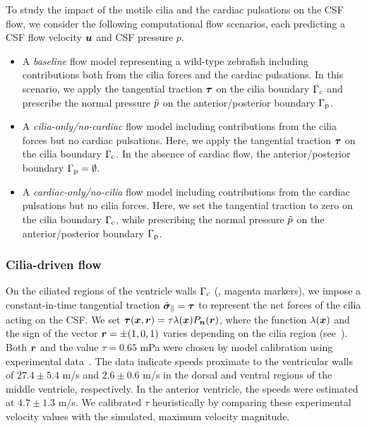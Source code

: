 \documentclass{WileyMSP-template}
\begin{document}
To study the impact of the motile cilia and the cardiac pulsations on the CSF flow,
we consider the following computational flow scenarios,
each predicting a CSF flow velocity $\bm{u}$ and CSF pressure $p$.
\begin{itemize}
    \item A \emph{baseline} flow model representing a wild-type zebrafish including 
    contributions both from the cilia forces and the cardiac pulsations.
    In this scenario, we apply the tangential traction $\bm{\tau}$ on the cilia boundary
    $\Gamma_{\mathrm{c}}$ and prescribe the normal pressure $\Tilde{p}$ on the anterior/posterior boundary $\Gamma_{\mathrm{p}}$. %

    \item A \emph{cilia-only/no-cardiac} flow model including contributions from the
    cilia forces but no cardiac pulsations.
    Here, we apply the tangential traction $\bm{\tau}$ on the cilia boundary $\Gamma_{\mathrm{c}}$.
    In the absence of cardiac flow, the anterior/posterior boundary $\Gamma_{\mathrm{p}}=\emptyset$. %

    \item A \emph{cardiac-only/no-cilia} flow model including contributions from the
    cardiac pulsations but no cilia forces.
    Here, we set the tangential traction to zero on the cilia boundary
    $\Gamma_{\mathrm{c}}$, while prescribing the normal pressure $\Tilde{p}$ on the
    anterior/posterior boundary $\Gamma_{\mathrm{p}}$.  %
\end{itemize}

\subsubsection{Cilia-driven flow}
On the ciliated regions of the ventricle walls $\Gamma_{\mathrm{c}}$ (, magenta markers),
we impose a constant-in-time tangential traction $\hat{\bm{\sigma}}_{\parallel}=\bm{\tau}$ to represent the net forces
of the cilia acting on the CSF.
We set $\bm{\tau}(\bm{x}, \bm{r}) = \tau \lambda(\bm{x}) P_{\bm{n}}(\bm{r})$, where the function $\lambda(\bm{x})$
and the sign of the vector $\bm{r}=\pm(1, 0, 1)$ varies depending on the
cilia region (see~).
Both $\bm{r}$ and the value $\tau=0.65$ mPa were chosen by 
model calibration using experimental data~\cite{Olstad2019CiliaryDevelopment}.
The data indicate speeds proximate to the ventricular walls of $27.4 \pm 5.4$ \textmu m/s and
$2.6 \pm 0.6$ \textmu m/s in the dorsal and ventral regions of the middle ventricle, respectively.
In the anterior ventricle, the speeds were estimated at $4.7 \pm 1.3$ \textmu m/s.
We calibrated $\tau$ heuristically by comparing these experimental velocity values
with the simulated, maximum velocity magnitude.
\end{document}
